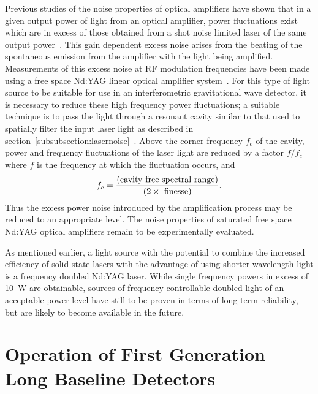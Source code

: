 \documentclass{article}
\begin{document}
Previous studies of the noise properties of optical amplifiers have
shown that in a given output power of light from an optical amplifier,
power fluctuations exist which are in excess of those obtained from a
shot noise limited laser of the same output power~\cite{Harris}. This
gain dependent excess noise arises from the beating of the spontaneous
emission from the amplifier with the light being amplified.
Measurements of this excess noise at RF modulation frequencies have
been made using a free space Nd:YAG linear optical amplifier
system~\cite{Tulloch}. For this type of light source to be suitable
for use in an interferometric gravitational wave detector, it is
necessary to reduce these high frequency power fluctuations; a
suitable technique is to pass the light through a resonant cavity
similar to that used to spatially filter the input laser light as
described in section~\ref{subsubsection:lasernoise}~\cite{Willke}. Above
the corner frequency $f_{c}$ of the cavity, power and frequency
fluctuations of the laser light are reduced by a factor $f/ f_{c}$
where $f$ is the frequency at which the fluctuation occurs, and 
%
\begin{equation}
  f_c = \frac{({\rm cavity\ free\ spectral\ range})}{(2 \times {\rm
  \ finesse})}.
  \label{equation:filtering}
\end{equation}
%
Thus the excess power noise introduced by the amplification process
may be reduced to an appropriate level. The noise properties of
saturated free space Nd:YAG optical amplifiers remain to be
experimentally evaluated.

As mentioned earlier, a light source with the potential to combine the
increased efficiency of solid state lasers with the advantage of using
shorter wavelength light is a frequency doubled Nd:YAG laser. 
While single frequency powers in excess of 10~W are obtainable, 
sources of frequency-controllable doubled light of 
an acceptable power level have still to be proven in terms of long term 
reliability, but are likely to become available in the future.


\newpage

\section{Operation of First Generation Long Baseline Detectors}
\label{section:construction}
\end{document}
